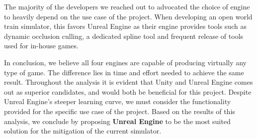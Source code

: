 The majority of the developers we reached out to advocated the choice of engine to heavily depend on the use case of the project. When developing an open world train simulator, this favors Unreal Engine as their engine provides tools such as dynamic occlusion culling, a dedicated spline tool and frequent release of tools used for in-house games.

In conclusion, we believe all four engines are capable of producing virtually any type of game. The difference lies in time and effort needed to achieve the same result. Throughout the analysis it is evident that Unity and Unreal Engine comes out as superior candidates, and would both be beneficial for this project. Despite Unreal Engine's steeper learning curve, we must consider the functionality provided for the specific use case of the project. Based on the results of this analysis, we conclude by proposing \textbf{Unreal Engine} to be the most suited solution for the mitigation of the current simulator.



